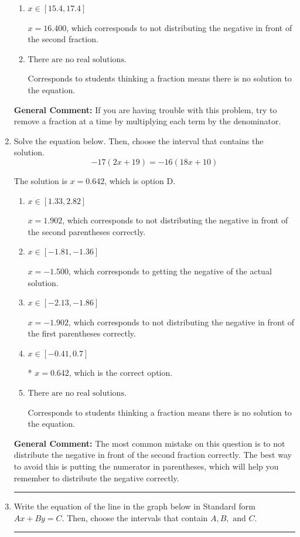 \documentclass{extbook}[14pt]
\newcommand{\litem}[1]{\item #1

\rule{\textwidth}{0.4pt}}
\begin{document}
\begin{enumerate}
{\begin{enumerate}[label=\Alph*.]
* $x = 11.600$, which is the correct option.
\item \( x \in [15.4, 17.4] \)

 $x = 16.400$, which corresponds to not distributing the negative in front of the second fraction.
\item \( \text{There are no real solutions.} \)

Corresponds to students thinking a fraction means there is no solution to the equation.
\end{enumerate}

\textbf{General Comment:} If you are having trouble with this problem, try to remove a fraction at a time by multiplying each term by the denominator.
}
\litem{
Solve the equation below. Then, choose the interval that contains the solution.
\[ -17(2x + 19) = -16(18x + 10) \]

The solution is \( x = 0.642 \), which is option D.\begin{enumerate}[label=\Alph*.]
\item \( x \in [1.33, 2.82] \)

$x = 1.902$, which corresponds to not distributing the negative in front of the second parentheses correctly.
\item \( x \in [-1.81, -1.36] \)

$x = -1.500$, which corresponds to getting the negative of the actual solution.
\item \( x \in [-2.13, -1.86] \)

$x = -1.902$, which corresponds to not distributing the negative in front of the first parentheses correctly.
\item \( x \in [-0.41, 0.7] \)

* $x = 0.642$, which is the correct option.
\item \( \text{There are no real solutions.} \)

Corresponds to students thinking a fraction means there is no solution to the equation.
\end{enumerate}

\textbf{General Comment:} The most common mistake on this question is to not distribute the negative in front of the second fraction correctly. The best way to avoid this is putting the numerator in parentheses, which will help you remember to distribute the negative correctly.
}
\litem{
Write the equation of the line in the graph below in Standard form $Ax+By=C$. Then, choose the intervals that contain $A, B, \text{ and } C$.

}
\end{enumerate}
\end{document}
